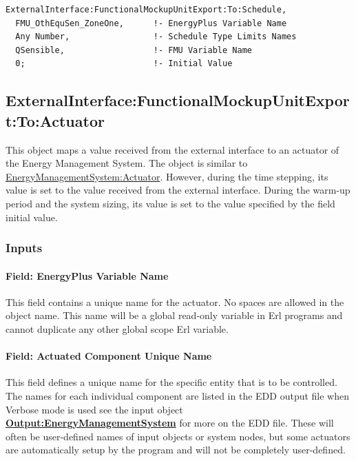 \begin{lstlisting}
ExternalInterface:FunctionalMockupUnitExport:To:Schedule,
  FMU_OthEquSen_ZoneOne,      !- EnergyPlus Variable Name
  Any Number,                 !- Schedule Type Limits Names
  QSensible,                  !- FMU Variable Name
  0;                          !- Initial Value
\end{lstlisting}

\subsection{ExternalInterface:FunctionalMockupUnitExport:To:Actuator}\label{externalinterfacefunctionalmockupunitexporttoactuator}

This object maps a value received from the external interface to an actuator of the Energy Management System. The object is similar to \hyperref[energymanagementsystemactuator]{EnergyManagementSystem:Actuator}. However, during the time stepping, its value is set to the value received from the external interface. During the warm-up period and the system sizing, its value is set to the value specified by the field initial value.

\subsubsection{Inputs}\label{inputs-11-004}

\paragraph{Field: EnergyPlus Variable Name}\label{field-energyplus-variable-name-6}

This field contains a unique name for the actuator. No spaces are allowed in the object name. This name will be a global read-only variable in Erl programs and cannot duplicate any other global scope Erl variable.

\paragraph{Field: Actuated Component Unique Name}\label{field-actuated-component-unique-name-2}

This field defines a unique name for the specific entity that is to be controlled. The names for each individual component are listed in the EDD output file when Verbose mode is used see the input object \textbf{\hyperref[outputenergymanagementsystem]{Output:EnergyManagementSystem}} for more on the EDD file. These will often be user-defined names of input objects or system nodes, but some actuators are automatically setup by the program and will not be completely user-defined.

